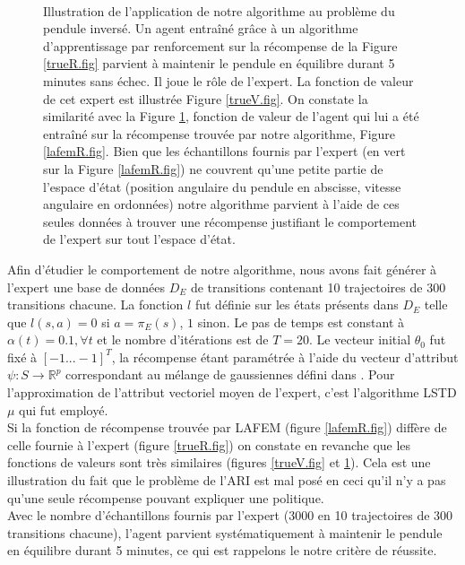 \documentclass[publibook-draft]{CAp2012}
\begin{document}
\begin{figure}
\begin{minipage}[t]{.5\linewidth}
\begin{center}
       \caption{}
       \label{lafemV.fig}
    \end{center}
\end{minipage}\\
\caption*{Illustration de l'application de notre algorithme au problème du pendule inversé. Un agent entraîné grâce à un algorithme d'apprentissage par renforcement sur la récompense de la Figure \ref{trueR.fig} parvient à maintenir le pendule en équilibre durant 5 minutes sans échec. Il joue le rôle de l'expert. La fonction de valeur de cet expert est illustrée Figure \ref{trueV.fig}. On constate la similarité avec la Figure \ref{lafemV.fig}, fonction de valeur de l'agent qui lui a été entraîné sur la récompense trouvée par notre algorithme, Figure \ref{lafemR.fig}. Bien que les échantillons fournis par l'expert (en vert sur la Figure \ref{lafemR.fig}) ne couvrent qu'une petite partie de l'espace d'état (position angulaire du pendule en abscisse, vitesse angulaire en ordonnées) notre algorithme parvient à l'aide de ces seules données à trouver une récompense justifiant le comportement de l'expert sur tout l'espace d'état.}
\end{figure}
Afin d'étudier le comportement de notre algorithme, nous avons fait générer à l'expert une base de données $D_E$ de transitions contenant 10 trajectoires de 300 transitions chacune. La fonction $l$ fut définie sur les états présents dans $D_E$ telle que $l(s,a) = 0$ si $a=\pi_E(s)$, $1$ sinon. Le pas de temps est constant à $\alpha(t) = 0.1, \forall t$ et le nombre d'itérations est de $T=20$. Le vecteur initial $\theta_0$ fut fixé à $[-1...-1]^T$, la récompense étant paramétrée à l'aide du vecteur d'attribut $\psi : S \rightarrow \mathbb{R}^p$ correspondant au mélange de gaussiennes défini dans \cite{lagoudakis2003least}. Pour l'approximation de l'attribut vectoriel moyen de l'expert, c'est l'algorithme LSTD$\mu$ qui fut employé.\\


Si la fonction de récompense trouvée par LAFEM (figure \ref{lafemR.fig}) diffère de celle fournie à l'expert (figure \ref{trueR.fig}) on constate en revanche que les fonctions de valeurs sont très similaires (figures \ref{trueV.fig} et \ref{lafemV.fig}). Cela est une illustration du fait que le problème de l'ARI est mal posé en ceci qu'il n'y a pas qu'une seule récompense pouvant expliquer une politique.\\

Avec le nombre d'échantillons fournis par l'expert (3000 en 10 trajectoires de 300 transitions chacune), l'agent parvient systématiquement à maintenir le pendule en équilibre durant 5 minutes, ce qui est rappelons le notre critère de réussite.\\
\end{document}
